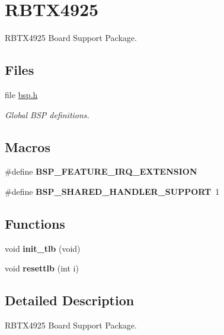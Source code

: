 \hypertarget{group__RTEMSBSPsMIPSRBTX4925}{}\section{R\+B\+T\+X4925}
\label{group__RTEMSBSPsMIPSRBTX4925}


R\+B\+T\+X4925 Board Support Package.  


\subsection*{Files}
\begin{DoxyCompactItemize}
\item 
file \mbox{\hyperlink{bsps_2mips_2rbtx4925_2include_2bsp_8h}{bsp.\+h}}
\begin{DoxyCompactList}\small\item\em Global B\+SP definitions. \end{DoxyCompactList}\end{DoxyCompactItemize}
\subsection*{Macros}
\begin{DoxyCompactItemize}
\item 
\mbox{\label{group__RTEMSBSPsMIPSRBTX4925_ga5d7d631d3a14b7554160f14eb42f351b}} 
\#define {\bfseries B\+S\+P\+\_\+\+F\+E\+A\+T\+U\+R\+E\+\_\+\+I\+R\+Q\+\_\+\+E\+X\+T\+E\+N\+S\+I\+ON}
\item 
\mbox{\label{group__RTEMSBSPsMIPSRBTX4925_ga2fe5e739729e5756a04cc73da64cc8ee}} 
\#define {\bfseries B\+S\+P\+\_\+\+S\+H\+A\+R\+E\+D\+\_\+\+H\+A\+N\+D\+L\+E\+R\+\_\+\+S\+U\+P\+P\+O\+RT}~1
\end{DoxyCompactItemize}
\subsection*{Functions}
\begin{DoxyCompactItemize}
\item 
\mbox{\label{group__RTEMSBSPsMIPSRBTX4925_gacb3eb371c98c83f4058d92f3e0bb74a8}} 
void {\bfseries init\+\_\+tlb} (void)
\item 
\mbox{\label{group__RTEMSBSPsMIPSRBTX4925_ga5aac3896e936d66009fe668385795a58}} 
void {\bfseries resettlb} (int i)
\end{DoxyCompactItemize}


\subsection{Detailed Description}
R\+B\+T\+X4925 Board Support Package. 

